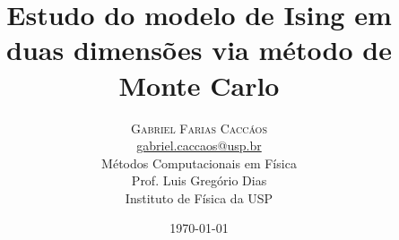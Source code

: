 \title{Estudo do modelo de Ising em duas dimensões via método de Monte Carlo}
\author{%
	\textsc{Gabriel Farias Caccáos} \\[1ex]
	\normalsize \href{mailto:gabriel.caccaos@usp.br}{gabriel.caccaos@usp.br} \\[1ex]
	\normalsize Métodos Computacionais em Física \\
	\normalsize Prof. Luis Gregório Dias \\
	\normalsize Instituto de Física da USP \\
}
\date{\today}
